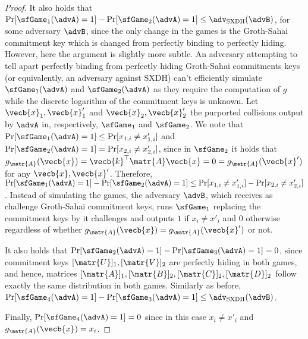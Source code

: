 \begin{proof}
It also holds that $\Pr[\sfGame_1(\advA)=1]-\Pr[\sfGame_2(\advA)=1]\leq\adv_\mathrm{SXDH}(\advB)$, for some adversary $\advB$, since the only change in the games is the Groth-Sahai commitment key which is changed from perfectly binding to perfectly hiding. However, here the argument is slightly more subtle. An adversary attempting to tell apart perfectly binding from perfectly hiding Groth-Sahai commitments keys (or equivalently, an adversary against SXDH) can't efficiently simulate $\sfGame_1(\advA)$ and $\sfGame_2(\advA)$ as they require the computation of $g$ while the discrete logarithm of the commitment keys is unknown. Let $\vecb{x}_1,\vecb{x}'_1$ and $\vecb{x}_2,\vecb{x}'_2$ the purported collisions output by $\advA$ in, respectively, $\sfGame_1$ and $\sfGame_2$. We note that $\Pr[\sfGame_1(\advA)=1] \leq \Pr[x_{1,i}\neq x'_{1,i}]$ and $\Pr[\sfGame_2(\advA)=1] = \Pr[x_{2,i}\neq x'_{2,i}]$, since in $\sfGame_2$ it holds that $g_{\matr{A}}(\vecb{x}) = \vecb{k}^\top\matr{A}\vecb{x} = 0 = g_\matr{A}(\vecb{x}')$ for any $\vecb{x},\vecb{x}'$. Therefore, $\Pr[\sfGame_1(\advA)=1]-\Pr[\sfGame_2(\advA)=1]\leq \Pr[x_{1,i}\neq x'_{1,i}]-\Pr[x_{2,i}\neq x'_{2,i}]$. Instead of simulating the games, the adversary $\advB$, which receives as challenge Groth-Sahai commitment keys, runs $\sfGame_1$ replacing the commitment keys by it challenges and outputs $1$ if $x_i\neq x'_i$ and $0$ otherwise regardless of whether $g_\matr{A}(\vecb{x})=g_{\matr{A}}(\vecb{x}')$ or not.

It also holds that $\Pr[\sfGame_2(\advA)=1]-\Pr[\sfGame_3(\advA)=1]=0$, since commitment keys $[\matr{U}]_1,[\matr{V}]_2$ are perfectly hiding in both games, and hence, matrices $[\matr{A}]_1,[\matr{B}]_2,[\matr{C}]_2,[\matr{D}]_2$ follow exactly the same distribution in both games.
Similarly as before, $\Pr[\sfGame_4(\advA)=1]-\Pr[\sfGame_3(\advA)=1]\leq\adv_\mathrm{SXDH}(\advB)$.

Finally, $\Pr[\sfGame_4(\advA)=1]=0$ since in this case $x_i \neq x'_i$ and $g_\matr{A}(\vecb{x}) = x_i$.
\end{proof}